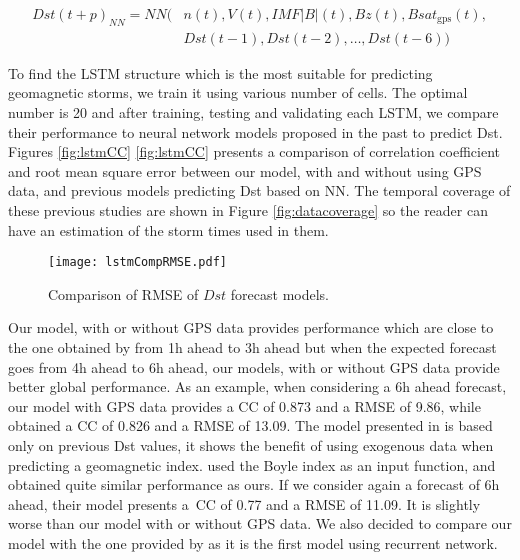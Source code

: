 \begin{equation}\label{eq:dstmodel}
	\begin{aligned}
		Dst \left( t+p \right)_{NN} = NN ( 
			& n \left( t \right) , V \left( t \right) , IMF \vert B \vert  \left( t \right) ,Bz \left( t \right) , Bsat_{\text{gps}} \left( t \right) , \\ 
			&	Dst \left( t-1 \right) ,Dst \left( t-2 \right) , \ldots ,Dst \left( t-6 \right) )
	\end{aligned}
\end{equation}

To find the LSTM structure which is the most suitable for predicting geomagnetic storms, we train it 
using various number of cells. The optimal number is 20 and after training, testing and validating each 
LSTM, we compare their performance to neural network models proposed in the past to predict Dst. 
Figures \ref{fig:lstmCC} \ref{fig:lstmCC} presents a  comparison of correlation coefficient and root mean square error 
between our model, with and without using GPS data, and previous models predicting Dst based on NN. 
The temporal coverage of these previous studies are shown in Figure \ref{fig:datacoverage} so the reader 
can have an estimation of the storm times used in them. 

\begin{figure}
	\texttt{[image: lstmCompRMSE.pdf]}
	\caption{Comparison of RMSE of $Dst$ forecast models.}
	\label{fig:lstmRMSE}
\end{figure}





Our model, with or without GPS data provides performance which are close to the one obtained by 
\citet{Lazzus} from 1h ahead to 3h ahead but when the expected forecast goes from 4h ahead to 6h ahead, 
our models, with or without GPS data provide better global performance. As an example, when considering a 6h 
ahead forecast, our model with GPS data provides a CC of 0.873 and a RMSE of 9.86, while \citet{Lazzus} 
obtained a CC of 0.826 and a RMSE of 13.09. The model presented in \citet{Lazzus} is based only on 
previous Dst values, it shows the benefit of using exogenous data when predicting a geomagnetic index. 
\citet{Bala2012} used the Boyle index as an input function, and obtained quite similar 
performance as ours. If we consider again a forecast of 6h ahead, their model presents a\ CC of 0.77 
and a RMSE of 11.09. It is slightly worse than our model with or without GPS data. We also decided to compare 
our model with the one provided by \citet{wu1997geomagnetic} as it is the first model using 
recurrent network. 

